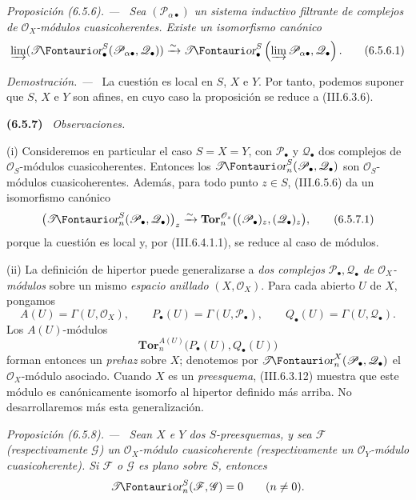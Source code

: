 \documentclass[10pt,oneside]{book}
\makeatletter
\newcommand{\sh}[1]{\mathscr{#1}}
\newcommand*{\ega@sheafop}[3]{\sh{#1}#2\textup{\kern-2.2pt{\Fontauri\slshape #3}}}
\newcommand{\shTor}{\ega@sheafop{T}{}{or}}
\newcommand{\sref}[2][]{\textup{(#2)}}
\newenvironment{env}[1][]{\par\medskip\noindent\textbf{(#1)}\ }{\par}
\newenvironment{proposition}[1][]{\par\medskip\noindent\itshape Proposición (#1). ---\ }{\par}
\newenvironment{proof}{\par\medskip\noindent\textit{Demostración. ---\ }}{\par}
\makeatother
\begin{document}
\begin{proposition}[6.5.6]
\label{III.6.5.6}
Sea $(\sh P_{\alpha\bullet})$ un sistema inductivo filtrante de
complejos de $\sh O_X$-módulos cuasicoherentes. Existe un
isomorfismo canónico
\[
  \varinjlim
  (\boldsymbol{\shTor}_\bullet^S(\sh P_{\alpha\bullet},\sh Q_\bullet))
  \xrightarrow{\sim}
  \boldsymbol{\shTor}_\bullet^S
  \left(\varinjlim\sh P_{\alpha\bullet},\sh Q_\bullet\right).
  \tag{6.5.6.1}\label{III.6.5.6.1}
\]
\end{proposition}

\begin{proof}
La cuestión es local en $S$, $X$ e $Y$. Por tanto, podemos
suponer que $S$, $X$ e $Y$ son afines, en cuyo caso la proposición
se reduce a \sref{III.6.3.6}.
\end{proof}

\begin{env}[6.5.7]
\label{III.6.5.7}
\emph{Observaciones.}

\textnormal{(i)} Consideremos en particular el caso $S=X=Y$, con
$\sh P_\bullet$ y $\sh Q_\bullet$ dos complejos de
$\sh O_S$-módulos cuasicoherentes. Entonces los
$\boldsymbol{\shTor}_n^S(\sh P_\bullet,\sh Q_\bullet)$ son
$\sh O_S$-módulos cuasicoherentes. Además, para todo punto
$z\in S$, \sref{III.6.5.6} da un isomorfismo canónico
\[
  \bigl(\boldsymbol{\shTor}_n^S(\sh P_\bullet,\sh Q_\bullet)\bigr)_z
  \xrightarrow{\sim}
  \mathbf{Tor}_n^{\sh O_z}
  \bigl((\sh P_\bullet)_z,(\sh Q_\bullet)_z\bigr),
  \tag{6.5.7.1}\label{III.6.5.7.1}
\]
porque la cuestión es local y, por \sref{III.6.4.1.1}, se reduce
al caso de módulos.

\textnormal{(ii)} La definición de hipertor puede generalizarse
a \emph{dos complejos} $\sh P_\bullet,\sh Q_\bullet$ \emph{de
$\sh O_X$-módulos} sobre un mismo \emph{espacio anillado} $(X,\sh O_X)$.
Para cada abierto $U$ de $X$, pongamos
\[
  A(U)=\Gamma(U,\sh O_X),\qquad
  P_\bullet(U)=\Gamma(U,\sh P_\bullet),\qquad
  Q_\bullet(U)=\Gamma(U,\sh Q_\bullet).
\]
Los $A(U)$-módulos
\[
  \mathbf{Tor}_n^{A(U)}\bigl(P_\bullet(U),Q_\bullet(U)\bigr)
\]
forman entonces un \emph{prehaz} sobre $X$; denotemos por
$\boldsymbol{\shTor}_n^X(\sh P_\bullet,\sh Q_\bullet)$ el $\sh O_X$-módulo
asociado. Cuando $X$ es un \emph{preesquema}, \sref{III.6.3.12} muestra
que este módulo es canónicamente isomorfo al hipertor definido
más arriba. No desarrollaremos más esta generalización.
\end{env}

\begin{proposition}[6.5.8]
\label{III.6.5.8}
Sean $X$ e $Y$ dos $S$-preesquemas, y sea $\sh F$
\textup{(respectivamente} $\sh G$\textup{)} un $\sh O_X$-módulo cuasicoherente
\textup{(respectivamente} un $\sh O_Y$-módulo cuasicoherente\textup{)}. Si
$\sh F$ o $\sh G$ es plano sobre $S$, entonces
\[
  \shTor_n^S(\sh F,\sh G)=0\qquad(n\ne0).
\]
\end{proposition}
\end{document}
